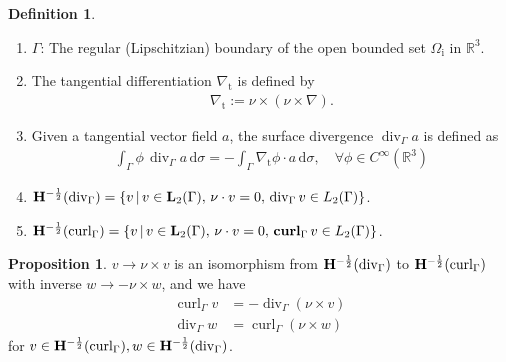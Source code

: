 \documentclass[a4paper,12pt]{article}
\theoremstyle{definition}
\newtheorem{dfn}{Definition}
\newtheorem{prp}{Proposition}
\newcommand\bdr{\Gamma}
\newcommand\Div{\divv_\bdr}
\newcommand\Curl{\curl_\bdr}
\newcommand\Hhm{{\bf H}^{-\frac{1}{2}}}
\newcommand\lTD{\Hhm(\Div)}
\newcommand\lTC{\Hhm(\Curl)}
\newcommand\intsn[1]{\int_{\bdr}#1\,\text{d}\sigma}
\DeclareMathOperator\curl{curl}
\DeclareMathOperator\divv{div}
\DeclareMathOperator\Curlv{{\bf curl}_\bdr}
\begin{document}
\begin{dfn}
  \begin{enumerate}
    \item $\bdr$: The regular (Lipschitzian) boundary of the open bounded set $\Omega_\text{i}$ in $\mathbb{R}^3$. 
    \item The tangential differentiation $\nabla_{\text{t}}$ is defined by 
      \begin{align*}
        \nabla_{\text{t}} :=\nu\times(\nu\times\nabla).
      \end{align*}
    \item Given a tangential vector field $a$, the surface divergence $\Div a$ is defined as
      \begin{align*}
        \intsn{\phi\,\Div a}=-\intsn{\nabla_{\text{t}}\phi\cdot a},\quad\forall\phi\in C^\infty(\mathbb{R}^3)
      \end{align*} 
    \item $\lTD = \{v\,|\,v\in {\bf L}_2(\bdr),\, \nu\cdot v=0, \,\Div v\in L_2(\bdr)\}$.
    \item $\lTC = \{v\,|\,v\in {\bf L}_2(\bdr),\, \nu\cdot v=0, \,\Curlv v\in L_2(\bdr)\}$.
  \end{enumerate}
\end{dfn}

\begin{prp}\label{thm:nuiso}
  $v\to\nu\times v$ is an isomorphism from $\lTD$ to $\lTC$ with inverse $w\to -\nu\times w$, and we have 
  \begin{align*}
    \Curl v &= -\Div (\nu\times v) \\
    \Div w  &= \Curl (\nu\times w)
  \end{align*}
  for $v\in\lTC, w\in\lTD$.
\end{prp}
\end{document}
